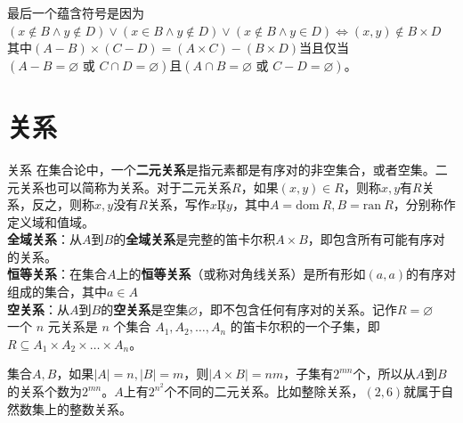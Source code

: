 \documentclass[lang=cn,11pt]{elegantbook}
\begin{document}
最后一个蕴含符号是因为$(x \notin B \land y \notin D)\lor(x \in B \land y \notin D)\lor(x \notin B \land y \in D)\Leftrightarrow (x,y) \notin B \times D$\\
其中$(A-B)\times(C-D)=(A\times C)-(B\times D)$当且仅当$(A-B=\varnothing\text{ 或 }C\cap D=\varnothing)$且$(A\cap B=\varnothing\text{ 或 }C-D=\varnothing)$。
\section{关系}
\begin{definition}{关系}
在集合论中，一个\textbf{二元关系}是指元素都是有序对的非空集合，或者空集。二元关系也可以简称为关系。对于二元关系$R$，如果$(x,y)\in R$，则称$x,y$有$R$关系，反之，则称$x,y$没有$R$关系，写作$x\not Ry$，其中$A=\text{dom}~R,B=\text{ran}~R$，分别称作定义域和值域。\\
\textbf{全域关系}：从$A$到$B$的\textbf{全域关系}是完整的笛卡尔积$A \times B$，即包含所有可能有序对的关系。\\
\textbf{恒等关系}：在集合$A$上的\textbf{恒等关系}（或称对角线关系）是所有形如$(a,a)$的有序对组成的集合，其中$a \in A$\\
\textbf{空关系}：从$A$到$B$的\textbf{空关系}是空集$\varnothing$，即不包含任何有序对的关系。记作$R = \varnothing$\\
一个 $n$ 元关系是 $n$ 个集合 $A_1, A_2, \dots, A_n$ 的笛卡尔积的一个子集，即 $R \subseteq A_1 \times A_2 \times \dots \times A_n$。
\end{definition}
集合$A,B$，如果$|A|=n,|B|=m$，则$|A\times B|=nm$，子集有$2^{mn}$个，所以从$A$到$B$的关系个数为$2^{mn}$。$A$上有$2^{n^2}$个不同的二元关系。比如整除关系，$(2,6)$就属于自然数集上的整数关系。
\end{document}
